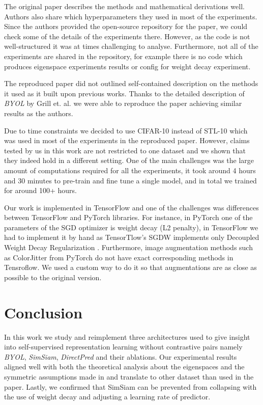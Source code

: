The original paper describes the methods and mathematical derivations well. Authors also share which hyperparameters they used in most of the experiments. Since the authors provided the open-source repository for the paper, we could check some of the details of the experiments there. However, as the code is not well-structured it was at times challenging to analyse. Furthermore, not all of the experiments are shared in the repository, for example there is no code which produces eigenspace experiments results or config for weight decay experiment. 

The reproduced paper did not outlined self-contained description on the methods it used as it built upon previous works. Thanks to the detailed description of \emph{BYOL} by Grill et. al. \cite{grill2020bootstrap}  we were able to reproduce the paper achieving similar results as the authors. 

Due to time constraints we decided to use CIFAR-10 instead of STL-10 which was used in most of the experiments in the reproduced paper. However, claims tested by us in this work are not restricted to one dataset and we shown that they indeed hold in a different setting. One of the main challenges was the large amount of computations required for all the experiments, it took around 4 hours and 30 minutes to pre-train and fine tune a single model, and in total we trained for around 100+ hours.

Our work is implemented in TensorFlow and one of the challenges was differences between TensorFlow and PyTorch libraries. For instance, in PyTorch one of the parameters of the SGD optimizer is weight decay (L2 penalty), in TensorFlow we had to implement it by hand as TensorTlow's SGDW implements only Decoupled Weight Decay Regularization \cite{loshchilov2017decoupled}. Furthermore, image augmentation methods such as ColorJitter from PyTorch do not have exact corresponding methods in Tensroflow. We used a custom way to do it so that augmentations are as close as possible to the original version. 


\section{Conclusion}
\label{sec:conclusion}

In this work we study and reimplement three architectures used to give insight into self-supervised representation learning without contrastive pairs namely \emph{BYOL}, \emph{SimSiam}, \emph{DirectPred} and their ablations. Our experimental results aligned well with both the theoretical analysis about the eigenspaces and the symmetric assumptions made in \cite{tian2021understanding} and translate to other dataset than used in the paper. Lastly, we confirmed that SimSiam can be prevented from collapsing with the use of weight decay and adjusting a learning rate of predictor. 

